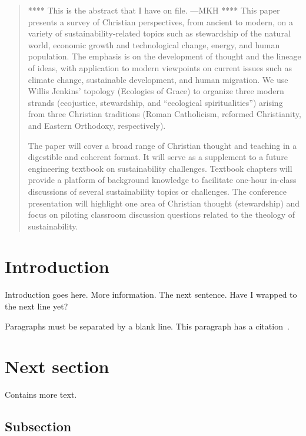 \documentclass[12pt]{article}
\begin{document}
	
\maketitle

\begin{abstract}
\noindent
**** This is the abstract that I have on file. ---MKH ****
This paper presents a survey of Christian perspectives, 
from ancient to modern, 
on a variety of sustainability-related topics such as stewardship of the natural world, 
economic growth and technological change, energy, and human population. 
The emphasis is on the development of thought and the lineage of ideas, 
with application to modern viewpoints on current issues 
such as climate change, sustainable development, and human migration. 
We use Willis Jenkins’ topology (Ecologies of Grace) 
to organize three modern strands 
(ecojustice, stewardship, and “ecological spiritualities”) 
arising from three Christian traditions 
(Roman Catholicism, reformed Christianity, and Eastern Orthodoxy, respectively).

The paper will cover a broad range of Christian thought and teaching 
in a digestible and coherent format. 
It will serve as a supplement to a future engineering textbook on sustainability challenges. 
Textbook chapters will provide a platform 
of background knowledge to facilitate one-hour in-class discussions
of several sustainability topics or challenges. 
The conference presentation will highlight 
one area of Christian thought (stewardship) 
and focus on piloting classroom discussion questions related to the theology of sustainability.
\end{abstract}


\section{Introduction}
\label{sec:introduction}

Introduction goes here. 
More information. 
The next sentence. 
Have I wrapped to the next line yet?

Paragraphs must be separated by a blank line.
This paragraph has a citation~\autocite[42]{bogus}.


\section{Next section}
\label{sec:next_sect}

Contains more text.


\subsection{Subsection}
\label{sec:subsection_label}


\printbibliography
\end{document}
